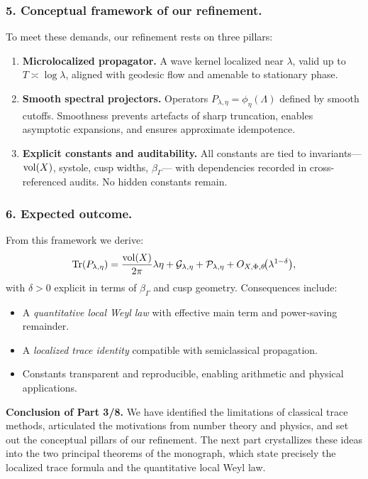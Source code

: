 \subsubsection*{5. Conceptual framework of our refinement.}
To meet these demands, our refinement rests on three pillars:

\begin{enumerate}[label=\Alph*.]
  \item \textbf{Microlocalized propagator.}
        A wave kernel localized near $\lambda$, valid up to $T\asymp\log\lambda$,
        aligned with geodesic flow and amenable to stationary phase.

  \item \textbf{Smooth spectral projectors.}
        Operators $P_{\lambda,\eta}=\phi_\eta(\Lambda)$ defined by smooth cutoffs.
        Smoothness prevents artefacts of sharp truncation, enables asymptotic expansions,
        and ensures approximate idempotence.

  \item \textbf{Explicit constants and auditability.}
        All constants are tied to invariants—$\operatorname{vol}(X)$, systole, cusp widths, $\beta_\Gamma$—
        with dependencies recorded in cross-referenced audits.
        No hidden constants remain.
\end{enumerate}

\subsubsection*{6. Expected outcome.}
From this framework we derive:
\[
  \operatorname{Tr}(P_{\lambda,\eta})
  = \frac{\operatorname{vol}(X)}{2\pi}\lambda\eta
    + \mathcal{G}_{\lambda,\eta}
    + \mathcal{P}_{\lambda,\eta}
    + O_{X,\Phi,\theta}\!\big(\lambda^{1-\delta}\big),
\]
with $\delta>0$ explicit in terms of $\beta_\Gamma$ and cusp geometry.
Consequences include:
\begin{itemize}
  \item A \emph{quantitative local Weyl law} with effective main term and power-saving remainder.
  \item A \emph{localized trace identity} compatible with semiclassical propagation.
  \item Constants transparent and reproducible, enabling arithmetic and physical applications.
\end{itemize}

\medskip

\noindent\textbf{Conclusion of Part 3/8.}
We have identified the limitations of classical trace methods, articulated the
motivations from number theory and physics, and set out the conceptual pillars
of our refinement. The next part crystallizes these ideas into the two principal
theorems of the monograph, which state precisely the localized trace formula
and the quantitative local Weyl law.

